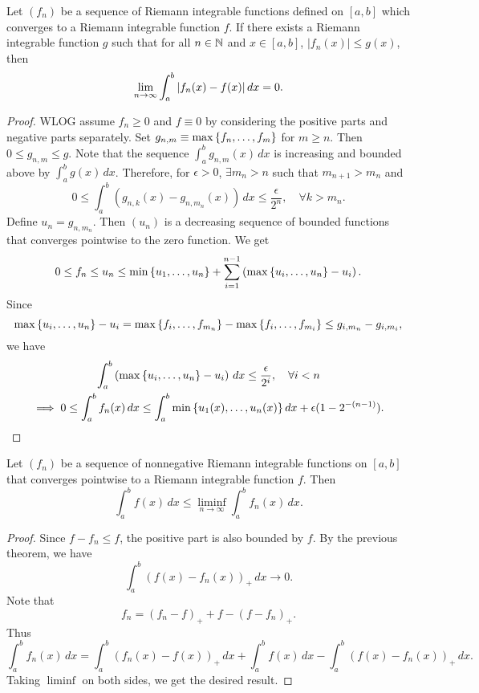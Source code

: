 \begin{thm}
    Let $(f_n)$ be a sequence of Riemann integrable functions defined on $[a, b]$ which converges to a Riemann integrable function $f$. If there exists a Riemann integrable function $g$ such that for all $n \in {\mathbb N}$ and $x \in [a, b]$, $|f_n(x)| \leq g(x)$, then
    \[
    \lim_{n \to \infty} \int_a^b {\left| f_n(x) - f(x) \right|} \, dx = 0.
    \]
    \begin{proof}
        WLOG assume $f_n \geq 0$ and $f \equiv 0$ by considering the positive parts and negative parts separately. Set $g_{n, m} \equiv \max{\left\{{f_n, \ldots, f_m}\right\}}$ for $m \geq n$. Then $0 \leq g_{n, m} \leq g$. Note that the sequence $\int_a^b g_{n, m}(x) \, dx$ is increasing and bounded above by $\int_a^b g(x) \, dx$. Therefore, for $\epsilon > 0$, $\exists m_n > n$ such that $m_{n+1} > m_n$ and
        \[
        0 \leq \int_a^b \left(g_{n, k}(x) - g_{n, m_n}(x)\right) \, dx \leq \frac{\epsilon}{2^n}, \quad \forall k > m_n.
        \]
        Define $u_n = g_{n, m_n}$. Then $(u_n)$ is a decreasing sequence of bounded functions that converges pointwise to the zero function. We get
        \[
        0 \leq f_n \leq u_n \leq \min{\left\{{u_1, \ldots, u_n}\right\}} + \sum_{i=1}^{n-1} \left(\max{\left\{{u_i, \ldots, u_n}\right\}} - u_i\right).
        \]
        Since
        \[
        \max{\left\{{u_i, \ldots, u_n}\right\}} - u_i = \max{\left\{{f_i, \ldots, f_{m_n}}\right\}} - \max{\left\{{f_i, \ldots, f_{m_i}}\right\}} \leq g_{i, m_n} - g_{i, m_i},
        \]
        we have
        \begin{gather*}
            \int_a^b \left(\max{\left\{{u_i, \ldots, u_n}\right\}} - u_i\right) \, dx \leq \frac{\epsilon}{2^i}, \quad \forall i < n \\
            \implies 0 \leq \int_a^b f_n(x) \, dx \leq \int_a^b \min{\left\{{u_1(x), \ldots, u_n(x)}\right\}} \, dx + \epsilon(1 - 2^{-(n-1)}).
        \end{gather*}
    \end{proof}
\end{thm}

\begin{thm}
    Let $(f_n)$ be a sequence of nonnegative Riemann integrable functions on $[a, b]$ that converges pointwise to a Riemann integrable function $f$. Then
    \[
    \int_a^b f(x) \, dx \leq \liminf_{n \to \infty} \int_a^b f_n(x) \, dx.
    \]
    \begin{proof}
        Since $f - f_n \leq f$, the positive part is also bounded by $f$. By the previous theorem, we have
        \[
        \int_a^b (f(x) - f_n(x))_+ \, dx \to 0.
        \]
        Note that
        \[
        f_n = (f_n - f)_+ + f - (f - f_n)_+.
        \]
        Thus
        \[
        \int_a^b f_n(x) \, dx = \int_a^b (f_n(x) - f(x))_+ \, dx + \int_a^b f(x) \, dx - \int_a^b (f(x) - f_n(x))_+ \, dx.
        \]
        Taking $\liminf$ on both sides, we get the desired result.
    \end{proof}
\end{thm}
